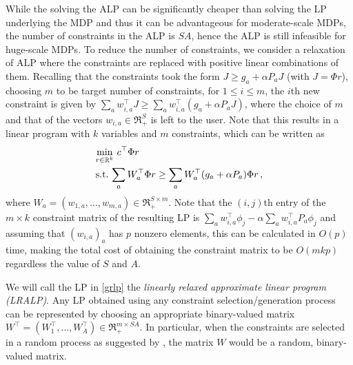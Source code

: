 While the solving the ALP can be significantly cheaper than solving the LP underlying the MDP
and thus it can be advantageous for moderate-scale MDPs,
  the number of constraints in the ALP is $SA$, 
 hence the ALP is still infeasible for huge-scale MDPs. 
To reduce the number of constraints, we consider a relaxation of ALP 
where the constraints are replaced with positive linear 
combinations of them. 
Recalling that the constraints took the form $J \ge g_a + \alpha P_a J$ (with $J = \Phi r$),
choosing $m$ to be target number of constraints, for $1\le i \le m$, the $i$th new constraint is given by
$\sum_a w_{i,a}^\top J \ge \sum_a w_{i,a}^\top(g_a + \alpha P_a J)$, 
where the choice of $m$ and that of the vectors $w_{i,a}\in \Re_+^S$ is left to the user.
Note that this results in a linear program with $k$ variables and $m$ constraints, which can be written as
\begin{align}\label{grlp}
\begin{split}
&\underset{r\in \Re^k}{\min}\, \, c^\top \Phi r\\
&\text{s.t.}\mb  \,\sum_a W_a^\top \Phi r\geq \sum_a W_a^\top (g_a + \alpha P_a) \Phi r\,,
\end{split}
\end{align}
where $W_a = (w_{1,a},\dots,w_{m,a}) \in \Re_+^{S \times m}$. 
Note that the $(i,j)$th entry of the $m\times k$ constraint matrix of the resulting LP is
$\sum_a  w_{i,a}^\top  \phi_j - \alpha \sum_a w_{i,a}^\top P_a \phi_j$ and assuming that $(w_{i,a})_{a}$ has $p$ nonzero
elements, this can be calculated in $O( p )$ time, making the total cost of obtaining the constraint matrix to be $O(mkp)$ regardless the value of $S$ and $A$. 

We will call the LP in \eqref{grlp} the \emph{linearly relaxed approximate linear program (LRALP)}.  Any LP obtained using 
any constraint selection/generation process can be represented by choosing an appropriate binary-valued matrix
$W^\top = (W_1^\top,\dots,W_A^\top)\in \Re_+^{m\times SA}$. In particular, when the constraints are selected
in a random process as suggested by \citet{CS}, the matrix $W$ would be a random, binary-valued matrix.

